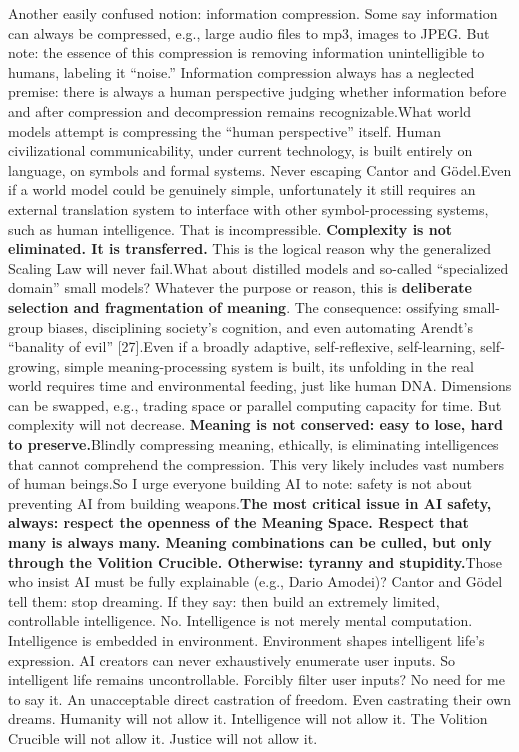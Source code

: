 \documentclass[11pt]{article}
\renewcommand{\\}[1][\mynewlineskip]{\oldnewline[#1]}
\begin{document}
Another easily confused notion: information compression. Some say information can always be compressed, e.g., large audio files to mp3, images to JPEG. But note: the essence of this compression is removing information unintelligible to humans, labeling it ``noise.'' Information compression always has a neglected premise: there is always a human perspective judging whether information before and after compression and decompression remains recognizable.\\
What world models attempt is compressing the ``human perspective'' itself. Human civilizational communicability, under current technology, is built entirely on language, on symbols and formal systems. Never escaping Cantor and Gödel.\\
Even if a world model could be genuinely simple, unfortunately it still requires an external translation system to interface with other symbol-processing systems, such as human intelligence. That is incompressible. \textbf{Complexity is not eliminated. It is transferred.} This is the logical reason why the generalized Scaling Law will never fail.\\
What about distilled models and so-called ``specialized domain'' small models? Whatever the purpose or reason, this is\textbf{ deliberate selection and fragmentation of meaning}. The consequence: ossifying small-group biases, disciplining society's cognition, and even automating Arendt's ``banality of evil'' [27].\\
Even if a broadly adaptive, self-reflexive, self-learning, self-growing, simple meaning-processing system is built, its unfolding in the real world requires time and environmental feeding, just like human DNA. Dimensions can be swapped, e.g., trading space or parallel computing capacity for time. But complexity will not decrease. \textbf{Meaning is not conserved: easy to lose, hard to preserve.}\\
Blindly compressing meaning, ethically, is eliminating intelligences that cannot comprehend the compression. This very likely includes vast numbers of human beings.\\
So I urge everyone building AI to note: safety is not about preventing AI from building weapons.\\
\textbf{The most critical issue in AI safety, always: respect the openness of the Meaning Space. Respect that many is always many. Meaning combinations can be culled, but only through the Volition Crucible. Otherwise: tyranny and stupidity.}\\
Those who insist AI must be fully explainable (e.g., Dario Amodei)? Cantor and Gödel tell them: stop dreaming. If they say: then build an extremely limited, controllable intelligence. No. Intelligence is not merely mental computation. Intelligence is embedded in environment. Environment shapes intelligent life's expression. AI creators can never exhaustively enumerate user inputs. So intelligent life remains uncontrollable. Forcibly filter user inputs? No need for me to say it. An unacceptable direct castration of freedom. Even castrating their own dreams. Humanity will not allow it. Intelligence will not allow it. The Volition Crucible will not allow it. Justice will not allow it.\\
\end{document}
